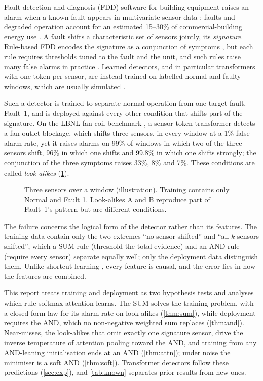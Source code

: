 \documentclass{article}
\theoremstyle{plain}
\theoremstyle{definition}
\theoremstyle{remark}
\begin{document}
Fault detection and diagnosis (FDD) software for building equipment raises an alarm when a known fault appears in multivariate sensor data \citep{katipamula2005a,kim2018}; faults and degraded operation account for an estimated 15--30\% of commercial-building energy use \citep{katipamula2005b}. A fault shifts a characteristic set of sensors jointly, its \emph{signature}. Rule-based FDD encodes the signature as a conjunction of symptoms \citep{house2001}, but each rule requires thresholds tuned to the fault and the unit, and such rules raise many false alarms in practice \citep{andersen2024}. Learned detectors, and in particular transformers with one token per sensor, are instead trained on labelled normal and faulty windows, which are usually simulated \citep{zhao2019,granderson2023}.

Such a detector is trained to separate normal operation from one target fault, Fault~1, and is deployed against every other condition that shifts part of the signature. On the LBNL fan-coil benchmark \citep{granderson2023}, a sensor-token transformer detects a fan-outlet blockage, which shifts three sensors, in every window at a 1\% false-alarm rate, yet it raises alarms on 99\% of windows in which two of the three sensors shift, 96\% in which one shifts and 99.8\% in which one shifts strongly; the conjunction of the three symptoms raises 33\%, 8\% and 7\%. These conditions are called \emph{look-alikes} (\cref{fig:windows}).

\begin{figure}[t]
  \centering
  
  \vspace{-2mm}
  \caption{Three sensors over a window (illustration). Training contains only Normal and Fault 1. Look-alikes A and B reproduce part of Fault~1's pattern but are different conditions.}\label{fig:windows}
  \vspace{-3mm}
\end{figure}

The failure concerns the logical form of the detector rather than its features. The training data contain only the two extremes ``no sensor shifted'' and ``all $k$ sensors shifted'', which a SUM rule (threshold the total evidence) and an AND rule (require every sensor) separate equally well; only the deployment data distinguish them. Unlike shortcut learning \citep{geirhos2020,shah2020}, every feature is causal, and the error lies in how the features are combined.

This report treats training and deployment as two hypothesis tests and analyses which rule softmax attention learns. The SUM solves the training problem, with a closed-form law for its alarm rate on look-alikes (\cref{thm:sum}), while deployment requires the AND, which no non-negative weighted sum replaces (\cref{thm:and}). Near-misses, the look-alikes that omit exactly one signature sensor, drive the inverse temperature of attention pooling toward the AND, and training from any AND-leaning initialisation ends at an AND (\cref{thm:attn}); under noise the minimiser is a soft AND (\cref{thm:soft}). Transformer detectors follow these predictions (\cref{sec:exp}), and \cref{tab:known} separates prior results from new ones.
\end{document}
